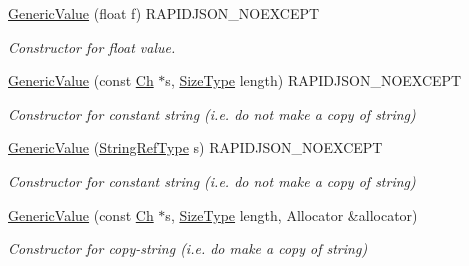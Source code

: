 \begin{DoxyCompactItemize}
\hyperlink{class_generic_value_acad11ab781251634a3c079aa64a6d283}{Generic\+Value} (float f) R\+A\+P\+I\+D\+J\+S\+O\+N\+\_\+\+N\+O\+E\+X\+C\+E\+PT
\begin{DoxyCompactList}\small\item\em Constructor for float value. \end{DoxyCompactList}\item 
\mbox{\label{class_generic_value_a4d9af98141360cd801daab4ed1ca2c91}} 
\hyperlink{class_generic_value_a4d9af98141360cd801daab4ed1ca2c91}{Generic\+Value} (const \hyperlink{class_generic_value_ade0e0ce64ccd5d852da57a35e720bafb}{Ch} $\ast$s, \hyperlink{rapidjson_8h_a5ed6e6e67250fadbd041127e6386dcb5}{Size\+Type} length) R\+A\+P\+I\+D\+J\+S\+O\+N\+\_\+\+N\+O\+E\+X\+C\+E\+PT
\begin{DoxyCompactList}\small\item\em Constructor for constant string (i.\+e. do not make a copy of string) \end{DoxyCompactList}\item 
\mbox{\label{class_generic_value_abb2887958974fef1b2b5c8e32cc72ddb}} 
\hyperlink{class_generic_value_abb2887958974fef1b2b5c8e32cc72ddb}{Generic\+Value} (\hyperlink{class_generic_value_a32e0f30ee278072374c8168b14d3317f}{String\+Ref\+Type} s) R\+A\+P\+I\+D\+J\+S\+O\+N\+\_\+\+N\+O\+E\+X\+C\+E\+PT
\begin{DoxyCompactList}\small\item\em Constructor for constant string (i.\+e. do not make a copy of string) \end{DoxyCompactList}\item 
\mbox{\label{class_generic_value_a9ec2c7cda8c8845acfa3565c6b1b4e10}} 
\hyperlink{class_generic_value_a9ec2c7cda8c8845acfa3565c6b1b4e10}{Generic\+Value} (const \hyperlink{class_generic_value_ade0e0ce64ccd5d852da57a35e720bafb}{Ch} $\ast$s, \hyperlink{rapidjson_8h_a5ed6e6e67250fadbd041127e6386dcb5}{Size\+Type} length, Allocator \&allocator)
\begin{DoxyCompactList}\small\item\em Constructor for copy-\/string (i.\+e. do make a copy of string) \end{DoxyCompactList}\item 
\mbox{\label{class_generic_value_a9b72b2e3347d4cd77b16c3b45e8decf1}} 

\end{DoxyCompactItemize}
